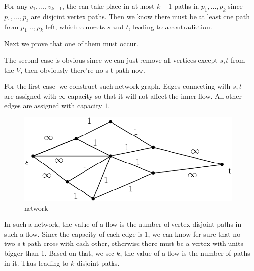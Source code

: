 \documentclass[UTF8]{ctexart}
\begin{document}
    For any $v_1, ..., v_{k - 1}$, the can take place in at most $k - 1$ paths in $p_1,...,p_k$ since $p_1, ..., p_k$ are
    disjoint vertex paths. Then we know there must be at least one path from $p_1,..,p_k$ left, which connects $s$ and $t$,
    leading to a contradiction.


    Next we prove that one of them must occur.

    The second case is obvious since we can just remove all vertices except $s, t$ from the $V$, then obviously there're no
    s-t-path now.

    For the first case, we construct such network-graph. Edges connecting with $s, t$ are assigned with $\infty$ capacity so
    that it will not affect the inner flow. All other edges are assigned with capacity $1$.

    \begin{figure}[h]
        \centering
        \includegraphics[scale=0.3]{figs/123.png}
        \caption{network}
    \end{figure}

    In such a network, the value of a flow is the number of vertex disjoint paths in such a flow. 
    Since the capacity of each edge is $1$, we can know for sure that no two s-t-path cross with each other,
    otherwise there must be a vertex with units bigger than 1. Based on that, we see $k$, the value of a flow 
    is the number of paths in it. Thus leading to $k$ disjoint paths.
\end{document}
